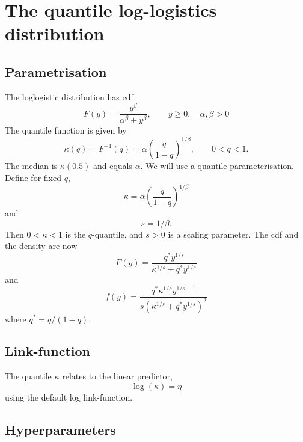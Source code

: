 \documentclass[a4paper,11pt]{article}
\begin{document}
\section*{The quantile log-logistics distribution}

\subsection*{Parametrisation}

The loglogistic distribution has cdf
\begin{displaymath} 
    F(y) = \frac{y^{\beta}}{\alpha^{\beta} + y^{\beta}}, \qquad y\ge
    0, \quad \alpha, \beta > 0
\end{displaymath}
The quantile function is given by
\begin{displaymath}
    \kappa(q) = F^{-1}(q) = \alpha
    \left(\frac{q}{1-q}\right)^{1/\beta}, \qquad 0 < q < 1.
\end{displaymath}
The median is $\kappa(0.5)$ and equals $\alpha$.
We will use a quantile parameterisation. Define for fixed $q$, 
\begin{displaymath}
    \kappa = \alpha \left(\frac{q}{1-q}\right)^{1/\beta}
\end{displaymath}
and
\begin{displaymath}
    s = 1/\beta.
\end{displaymath}
Then $0<\kappa<1$ is the $q$-quantile, and $s>0$ is a scaling parameter.
The cdf and the density are now
\begin{displaymath}
    F(y) = \frac{q^{*}y^{1/s}}{\kappa^{1/s} + q^{*} y^{1/s}}
\end{displaymath}
and 
\begin{displaymath}
    f(y) = \frac{q^{*} \kappa^{1/s} y^{1/s-1}}{s(\kappa^{1/s}+q^{*}y^{1/s})^{2}}
\end{displaymath}
where $q^{*} = q/(1-q)$.

\subsection*{Link-function}

The quantile $\kappa$ relates to the linear predictor,
\begin{displaymath}
    \log(\kappa) = \eta
\end{displaymath}
using the default log link-function.

\subsection*{Hyperparameters}
\end{document}
